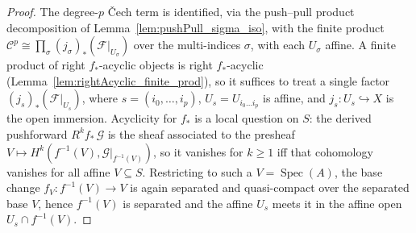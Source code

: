\begin{proof}
  The degree-\(p\) {\v C}ech term is identified, via the push--pull product decomposition
  of Lemma~\ref{lem:pushPull_sigma_iso}, with the finite product
  \(\mathcal{C}^p \cong \prod_{\sigma} (j_\sigma)_*(\mathcal{F}|_{U_\sigma})\) over the
  multi-indices \(\sigma\), with each \(U_\sigma\) affine. A finite product of right
  \(f_*\)-acyclic objects is right \(f_*\)-acyclic
  (Lemma~\ref{lem:rightAcyclic_finite_prod}), so it suffices to treat a single factor
  \((j_s)_*(\mathcal{F}|_{U_s})\), where \(s = (i_0, \ldots, i_p)\), \(U_s =
  U_{i_0 \ldots i_p}\) is affine, and \(j_s : U_s \hookrightarrow X\) is the open
  immersion. Acyclicity for \(f_*\) is a local question on \(S\): the derived
  pushforward \(R^k f_*\, \mathcal{G}\) is the sheaf associated to the presheaf
  \(V \mapsto H^k(f^{-1}(V), \mathcal{G}|_{f^{-1}(V)})\), so it vanishes for
  \(k \geq 1\) iff that cohomology vanishes for all affine \(V \subseteq S\).
  Restricting to such a \(V = \operatorname{Spec}(A)\), the base change \(f_V :
  f^{-1}(V) \to V\) is again separated and quasi-compact over the separated base
  \(V\), hence \(f^{-1}(V)\) is separated and the affine \(U_s\) meets it in the
  affine open \(U_s \cap f^{-1}(V)\).


\end{proof}
